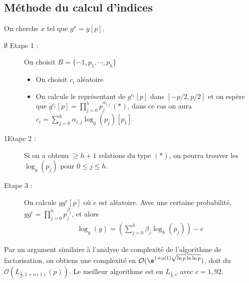         \subsection{Méthode du calcul d'indices}
            On cherche $x$ tel que $g^x = y[p]$.
            \begin{description}
                \item[ $\emptyset$ Etape 1 :] On choisit $B = \{-1, p_1, \cdots, p_h\}$
                \begin{itemize}
                    \item On choisit $c_i$ aléatoire
                    \item On calcule le représentant de $g^{c_i}[p]$ dans $[-p/2, p/2]$ et on espère que $g^{c_i}[p] = \prod_{j = 0}^h p_j^{\alpha_{i,j}} \, (*)$, dans ce cas on aura $c_i = \sum_{j = 0}^h \alpha_{i,j} \log_g(p_j) [p_1]$.
                \end{itemize} 
                \item[1Etape 2 :] Si on a obtenu $\geq h + 1$ relations du type $(*)$, on pourra trouver les $\log_g(p_j)$ pour $0 \leq j \leq h$.
                \item[Etape 3 :] On calcule $yg^e [p]$ où $e$ est aléatoire. Avec une certaine probabilité, $yg^e = \prod_{j = 0}^h p_j^{\beta_j}$, et alors
                \begin{align*}
                    \log_g(y) = \left(\sum_{j = 0}^h \beta_j \log_h(p_j)\right) - e
                \end{align*}
            \end{description}
            Par un argument similaire à l'analyse de complexité de l'algorithme de factorisation, on obtiens une complexité en $\mathcal{O}(\e^{1 + o(1) \sqrt{\ln p \ln \ln p}})$, doit du $\mathcal{O}(L_{\frac12, 1 + o(1)}(p))$. Le meilleur algorithme est en $L_{\frac13, c}$ avec $c = 1,92$. 